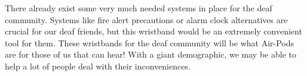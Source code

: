 There already exist some very much needed systems in place for the deaf community. Systems like fire alert precautions or alarm clock alternatives are crucial for our deaf friends, but this wristband would be an extremely convenient tool for them. These wristbands for the deaf community will be what Air-Pods are for those of us that can hear! With a giant demographic, we may be able to help a lot of people deal with their inconveniences.